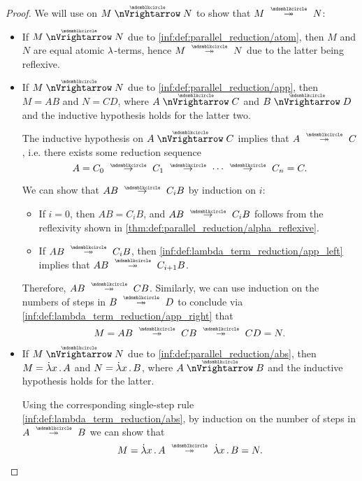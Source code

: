 \begin{proof}
   We will use  on \( M \ppred N \) to show that \( M \pred* N \):
  \begin{itemize}
    \item If \( M \ppred N \) due to \ref{inf:def:parallel_reduction/atom}, then \( M \) and \( N \) are equal atomic \( {\mathrm \lambda} \)-terms, hence \( M \pred* N \) due to the latter being reflexive.

    \item If \( M \ppred N \) due to \ref{inf:def:parallel_reduction/app}, then \( M = AB \) and \( N = CD \), where \( A \ppred C \) and \( B \ppred D \) and the inductive hypothesis holds for the latter two.

    The inductive hypothesis on \( A \ppred C \) implies that \( A \pred* C \), i.e. there exists some reduction sequence
    \begin{equation*}
      A = C_0 \pred C_1 \pred \cdots \pred C_n = C.
    \end{equation*}

    We can show that \( AB \pred C_i B \) by induction on \( i \):
    \begin{itemize}
      \item If \( i = 0 \), then \( AB = C_i B \), and \( AB \pred C_i B \) follows from the reflexivity shown in \cref{thm:def:parallel_reduction/alpha_reflexive}.

      \item If \( AB \pred* C_i B \), then \ref{inf:def:lambda_term_reduction/app_left} implies that \( AB \pred* C_{i+1} B \).
    \end{itemize}

    Therefore, \( AB \pred* CB \). Similarly, we can use induction on the numbers of steps in \( B \pred* D \) to conclude via \ref{inf:def:lambda_term_reduction/app_right} that
    \begin{equation*}
      M = AB \pred* CB \pred* CD = N.
    \end{equation*}

    \item If \( M \ppred N \) due to \ref{inf:def:parallel_reduction/abs}, then \( M = \qabs x A \) and \( N = \qabs x B \), where \( A \ppred B \) and the inductive hypothesis holds for the latter.

    Using the corresponding single-step rule \ref{inf:def:lambda_term_reduction/abs}, by induction on the number of steps in \( A \pred* B \) we can show that
    \begin{equation*}
      M = \qabs x A \pred* \qabs x B = N.
    \end{equation*}


\end{itemize}
\end{proof}

